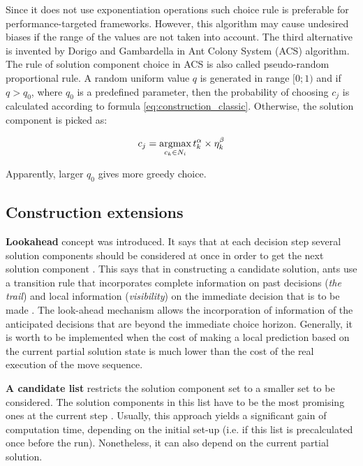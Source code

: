 \documentclass[11pt,a4paper,oneside]{book}
\begin{document}
Since it does not use exponentiation operations such choice rule is preferable for performance-targeted frameworks. However, this algorithm may cause undesired biases if the range of the values are not taken into account. The third alternative is invented by Dorigo and Gambardella \cite{dorigo} in Ant Colony System (ACS) algorithm. The rule of solution component choice in ACS is also called pseudo-random proportional rule. A random uniform value $q$ is generated in range $[0;1)$ and if $q>q_0$, where $q_0$ is a predefined parameter, then the probability of choosing $c_j$ is calculated according to formula \eqref{eq:construction_classic}. Otherwise, the solution component is picked as:

\begin{equation}
c_j = \operatornamewithlimits{argmax}\limits_{c_k \in N_i} t_k^\alpha \times \eta_k^\beta
\label{eq:construction_dorigo}
\end{equation}

Apparently, larger $q_0$ gives more greedy choice.

\subsection{Construction extensions}

\textbf{Lookahead} concept was introduced. It says that at each decision step several solution components should be considered at once in order to get the next solution component \cite{lookahead}. This says that in constructing a candidate solution, ants use a transition rule that incorporates complete information on past decisions (\emph{the trail}) and local information (\emph{visibility}) on the immediate decision that is to be made \cite{lookahead2}. The look-ahead mechanism allows the incorporation of information of the anticipated decisions that are beyond the immediate choice horizon. Generally, it is worth to be implemented when the cost of making a local prediction based on the current partial solution state is much lower than the cost of the real execution of the move sequence.

\textbf{A candidate list} restricts the solution component set to a smaller set to be considered. The solution components in this list have to be the most promising ones at the current step \cite{candidate_list}. Usually, this approach yields a significant gain of computation time, depending on the initial set-up (i.e. if this list is precalculated once before the run). Nonetheless, it can also depend on the current partial solution.
\end{document}
